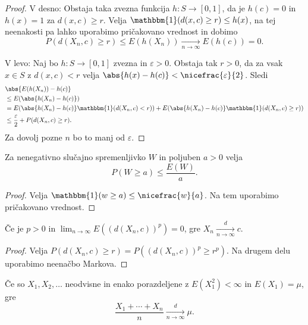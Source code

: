 \begin{proof}
  V desno:
  Obstaja taka zvezna funkcija $h: S \to [0,1]$, da je $h(c) = 0$ in $h(x) = 1$
  za $d(x, c) \ge r$.
  Velja $\mathbbm{1}(d(x, c) \ge r) \le h(x)$, na tej neenakosti pa lahko
  uporabimo pričakovano vrednost in dobimo
  \[
	P(d(X_n, c) \ge r) \le E(h(X_n)) \xrightarrow[n \to \infty]{} E(h(c)) = 0.
  \]

  V levo:
  Naj bo $h: S \to [0,1]$ zvezna in $\varepsilon > 0$.
  Obstaja tak $r > 0$, da za vsak $x \in S$ z $d(x, c) < r$ velja $\abs{h(x) -
	h(c)} < \nicefrac{\varepsilon}{2}$.
  Sledi
  \begin{align*}
	&\abs{E(h(X_n)) - h(c)} \\
	&\le E(\abs{h(X_n) - h(c)}) \\
	&= E(\abs{h(X_n) - h(c)} \mathbbm{1}(d(X_n, c) < r))
	  + E(\abs{h(X_n) - h(c)} \mathbbm{1}( d(X_n, c) \ge r )) \\
	&\le \frac{\varepsilon}{2} + P(d(X_n, c) \ge r).
  \end{align*}
  Za dovolj pozne $n$ bo to manj od $\varepsilon$.
\end{proof}


\begin{trditev}
  Za nenegativno slučajno spremenljivko $W$ in poljuben $a > 0$ velja
  \[
	P(W \ge a) \le \frac{E(W)}{a}.
  \]
\end{trditev}

\begin{proof}
  Velja $\mathbbm{1}(w \ge a) \le \nicefrac{w}{a}$.
  Na tem uporabimo pričakovano vrednost.
\end{proof}


\begin{trditev}
  Če je $p > 0$ in $\lim_{n \to \infty} E({(d(X_n, c))}^p) = 0$, gre $X_n
  \xrightarrow[n \to \infty]{d} c$.
\end{trditev}

\begin{proof}
  Velja $P(d(X_n, c) \ge r) = P({(d(X_n, c))}^p \ge r^p)$.
  Na drugem delu uporabimo neenačbo Markova.
\end{proof}

\begin{trditev}
  Če so $X_1, X_2, \ldots$ neodvisne in enako porazdeljene z $E(X_1^2) < \infty$
  in $E(X_1) = \mu$, gre
  \[
	\frac{X_1 + \cdots + X_n}{n} \xrightarrow[n \to \infty]{d} \mu.
  \]
\end{trditev}

